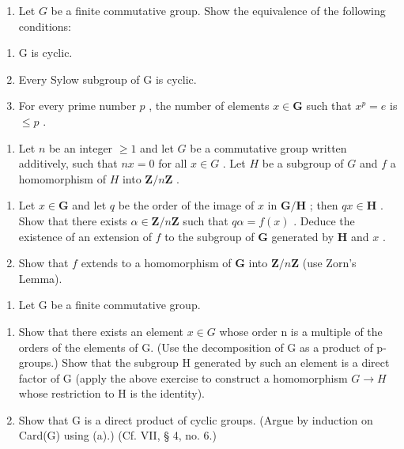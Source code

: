 \begin{enumerate}
\def\labelenumi{\arabic{enumi}.}
\setcounter{enumi}{16}
\tightlist
\item
  Let \(G\) be a finite commutative group. Show the equivalence of the following conditions:
\end{enumerate}

\begin{enumerate}
\def\labelenumi{(\alph{enumi})}
\item
  G is cyclic.
\item
  Every Sylow subgroup of G is cyclic.
\item
  For every prime number \(p\) , the number of elements \(x \in \mathbf{G}\) such that \(x^p = e\) is \(\leqslant p\) .
\end{enumerate}

\begin{enumerate}
\def\labelenumi{\arabic{enumi}.}
\setcounter{enumi}{17}
\tightlist
\item
  Let \(n\) be an integer \(\geqslant 1\) and let \(G\) be a commutative group written additively, such that \(nx = 0\) for all \(x \in G\) . Let \(H\) be a subgroup of \(G\) and \(f\) a homomorphism of \(H\) into \(\mathbf{Z} / n\mathbf{Z}\) .
\end{enumerate}

\begin{enumerate}
\def\labelenumi{(\alph{enumi})}
\item
  Let \(x \in \mathbf{G}\) and let \(q\) be the order of the image of \(x\) in \(\mathbf{G} / \mathbf{H}\) ; then \(qx \in \mathbf{H}\) . Show that there exists \(\alpha \in \mathbf{Z} / n\mathbf{Z}\) such that \(q\alpha = f(x)\) . Deduce the existence of an extension of \(f\) to the subgroup of \(\mathbf{G}\) generated by \(\mathbf{H}\) and \(x\) .
\item
  Show that \(f\) extends to a homomorphism of \(\mathbf{G}\) into \(\mathbf{Z} / n\mathbf{Z}\) (use Zorn's Lemma).
\end{enumerate}

\begin{enumerate}
\def\labelenumi{\arabic{enumi}.}
\setcounter{enumi}{18}
\tightlist
\item
  Let G be a finite commutative group.
\end{enumerate}

\begin{enumerate}
\def\labelenumi{(\alph{enumi})}
\item
  Show that there exists an element \(x \in G\) whose order n is a multiple of the orders of the elements of G. (Use the decomposition of G as a product of p-groups.) Show that the subgroup H generated by such an element is a direct factor of G (apply the above exercise to construct a homomorphism \(G \to H\) whose restriction to H is the identity).
\item
  Show that G is a direct product of cyclic groups. (Argue by induction on Card(G) using (a).) (Cf. VII, § 4, no. 6.)
\end{enumerate}

